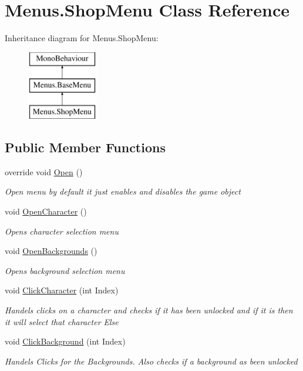 \hypertarget{class_menus_1_1_shop_menu}{}\section{Menus.\+Shop\+Menu Class Reference}
\label{class_menus_1_1_shop_menu}
Inheritance diagram for Menus.\+Shop\+Menu\+:\begin{figure}[H]
\begin{center}
\leavevmode
\includegraphics[height=3.000000cm]{class_menus_1_1_shop_menu}
\end{center}
\end{figure}
\subsection*{Public Member Functions}
\begin{DoxyCompactItemize}
\item 
override void \hyperlink{class_menus_1_1_shop_menu_af79b153c30d06137091f0b021d2c626b}{Open} ()
\begin{DoxyCompactList}\small\item\em Open menu by default it just enables and disables the game object \end{DoxyCompactList}\item 
void \hyperlink{class_menus_1_1_shop_menu_a73ccd36ee27ff79f736fc7aa563d1cc1}{Open\+Character} ()
\begin{DoxyCompactList}\small\item\em Opens character selection menu \end{DoxyCompactList}\item 
void \hyperlink{class_menus_1_1_shop_menu_a903ec61aa167d426010e4632ec9e3f59}{Open\+Backgrounds} ()
\begin{DoxyCompactList}\small\item\em Opens background selection menu \end{DoxyCompactList}\item 
void \hyperlink{class_menus_1_1_shop_menu_a403a38bf336dacd0d5f412ba0aaf4520}{Click\+Character} (int Index)
\begin{DoxyCompactList}\small\item\em Handels clicks on a character and checks if it has been unlocked and if it is then it will select that character Else \end{DoxyCompactList}\item 
void \hyperlink{class_menus_1_1_shop_menu_a8aa4cb8db5ba4c53087af77e39232cf6}{Click\+Background} (int Index)
\begin{DoxyCompactList}\small\item\em Handels Clicks for the Backgrounds. Also checks if a background as been unlocked \end{DoxyCompactList}\end{DoxyCompactItemize}
